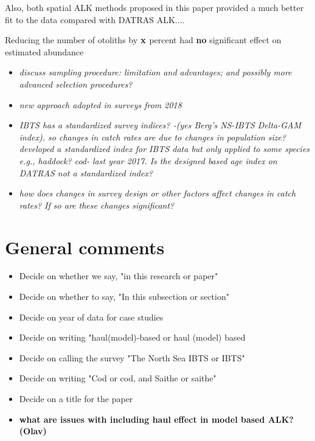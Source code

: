 \documentclass[a4paper 12pt]{article}
\numberwithin{equation}{section}
\begin{document}
Also, both spatial ALK methods proposed in this paper provided a much better fit to the data compared with DATRAS ALK....

Reducing the number of otoliths by ${\bf x}$ percent had {\bf no} significant effect on estimated abundance
\begin{itemize}
\item \emph{discuss sampling procedure: limitation and advantages; and possibly more advanced selection procedures? }
\item \emph{new approach adopted in surveys from 2018 }
\item \emph{IBTS has a standardized survey indices? -(yes Berg's NS-IBTS Delta-GAM index).  so changes in catch rates are due to changes in population size? \citet{berg2014evaluation} developed a standardized index for IBTS data but only applied to some species e.g., haddock? cod- last year 2017. Is the designed based age index on DATRAS not a standardized index?}
\item \emph{how does changes in survey design or other factors affect changes in catch rates? If so are these changes  significant? }
\end{itemize}


\section{General comments}

\begin{itemize}
\item Decide on whether we say, "in this research or paper"
\item Decide on whether to say, "In this subsection or section"
\item Decide on year of data for case studies
\item Decide on writing "haul(model)-based or haul (model) based
\item Decide on calling the survey "The North Sea IBTS or IBTS"
\item Decide on writing "Cod or cod, and Saithe or saithe"
\item Decide on a title for the paper
\item {\bf what are issues with including haul effect in model based ALK?
 (Olav)}
 
\end{itemize}

\clearpage
\end{document}
